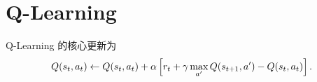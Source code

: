\section{Q-Learning}

Q-Learning 的核心更新为
\[
  Q(s_t,a_t)\leftarrow Q(s_t,a_t)+\alpha
  \left[
    r_t+\gamma\max_{a'}Q(s_{t+1},a')-Q(s_t,a_t)
  \right].
\]
